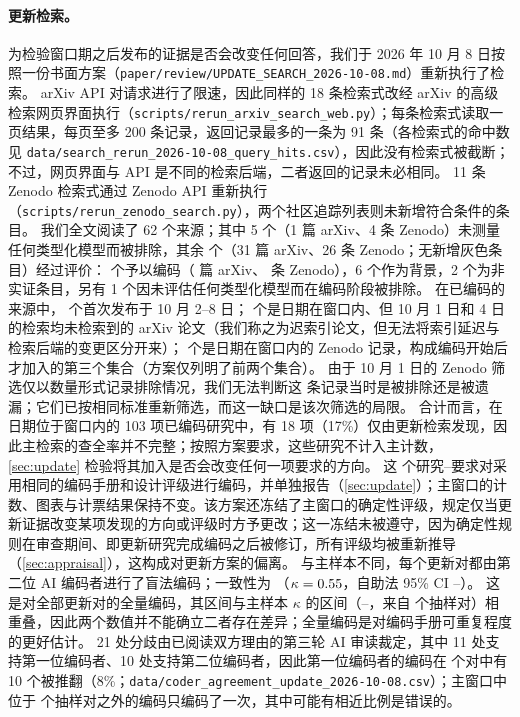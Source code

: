 \paragraph{更新检索。}
为检验窗口期之后发布的证据是否会改变任何回答，我们于 2026 年 10 月 8 日按照一份书面方案（\nolinkurl{paper/review/UPDATE_SEARCH_2026-10-08.md}）重新执行了检索。
arXiv API 对请求进行了限速，因此同样的 18 条检索式改经 arXiv 的高级检索网页界面执行（\nolinkurl{scripts/rerun_arxiv_search_web.py}）；每条检索式读取一页结果，每页至多 200 条记录，返回记录最多的一条为 91 条（各检索式的命中数见 \nolinkurl{data/search_rerun_2026-10-08_query_hits.csv}），因此没有检索式被截断；不过，网页界面与 API 是不同的检索后端，二者返回的记录未必相同。
11 条 Zenodo 检索式通过 Zenodo API 重新执行（\nolinkurl{scripts/rerun_zenodo_search.py}），两个社区追踪列表则未新增符合条件的条目。
我们全文阅读了 62 个来源；其中 5 个（1 篇 arXiv、4 条 Zenodo）未测量任何类型化模型而被排除，其余 \nUDocs{} 个（31 篇 arXiv、26 条 Zenodo；无新增灰色条目）经过评价：\nUCoded{} 个予以编码（\nUArxiv{} 篇 arXiv、\nUZenodo{} 条 Zenodo），6 个作为背景，2 个为非实证条目，另有 1 个因未评估任何类型化模型而在编码阶段被排除。
在已编码的来源中，\nUSetPostWindow{} 个首次发布于 10 月 2--8 日；\nUSetLateIndexed{} 个是日期在窗口内、但 10 月 1 日和 4 日的检索均未检索到的 arXiv 论文（我们称之为迟索引论文，但无法将索引延迟与检索后端的变更区分开来）；\nUSetReScreened{} 个是日期在窗口内的 Zenodo 记录，构成编码开始后才加入的第三个集合（方案仅列明了前两个集合）。
由于 10 月 1 日的 Zenodo 筛选仅以数量形式记录排除情况，我们无法判断这 \nUSetReScreened{} 条记录当时是被排除还是被遗漏；它们已按相同标准重新筛选，而这一缺口是该次筛选的局限。
合计而言，在日期位于窗口内的 103 项已编码研究中，有 18 项（17\%）仅由更新检索发现，因此主检索的查全率并不完整；按照方案要求，这些研究不计入主计数，\cref{sec:update} 检验将其加入是否会改变任何一项要求的方向。
这 \nURows{} 个研究--要求对采用相同的编码手册和设计评级进行编码，并单独报告（\cref{sec:update}）；主窗口的计数、图表与计票结果保持不变。该方案还冻结了主窗口的确定性评级，规定仅当更新证据改变某项发现的方向或评级时方予更改；这一冻结未被遵守，因为确定性规则在审查期间、即更新研究完成编码之后被修订，所有评级均被重新推导（\cref{sec:appraisal}），这构成对更新方案的偏离。
与主样本不同，每个更新对都由第二位 AI 编码者进行了盲法编码；一致性为 \nUKappaAgree{}（$\kappa = 0.55{}$，自助法 95\% CI \nUKappaLo{}--\nUKappaHi{}）。
这是对全部更新对的全量编码，其区间与主样本 $\kappa$ 的区间（\nKappaLo{}--\nKappaHi{}，来自 \nKappaN{} 个抽样对）相重叠，因此两个数值并不能确立二者存在差异；全量编码是对编码手册可重复程度的更好估计。
21 处分歧由已阅读双方理由的第三轮 AI 审读裁定，其中 11 处支持第一位编码者、10 处支持第二位编码者，因此第一位编码者的编码在 \nURows{} 个对中有 10 个被推翻（8\%；\nolinkurl{data/coder_agreement_update_2026-10-08.csv}）；主窗口中位于 \nKappaN{} 个抽样对之外的编码只编码了一次，其中可能有相近比例是错误的。

